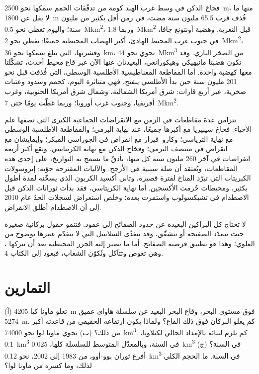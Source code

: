 فخاخ الدكن في وسط غرب الهند كومة من تدفّقات الحمم سمكها نحو \qty{2500}{m}، منها ما لا يقل عن \qty{1800}{m} قُذف قرب 65.5 مليون سنة مضت، في زمن أقل بكثير من مليون سنة؛ واليوم تغطي نحو \qty{0.5}{\mega km^2}، وربما \qty{1.8}{\mega km^2} قبل التعرية. وهضبة أونتونغ جافا، في جنوب غرب المحيط الهادئ، أكبر الهضاب المحيطية جميعًا: تغطي نحو \qty{2}{\mega km^2}، وقشرتها، التي يبلغ سمكها نحو \qty{36}{km}، تحوي نحو \qty{44}{\mega km^3} من الصخر الناري. وقد تكون هضبتا مانيهيكي وهيكورانغي، البعيدتان عنها الآن عبر قاع محيط أحدث، تشكّلتا معها كهضبة واحدة. أما المقاطعة المغناطيسية الأطلسية الوسطى، التي قُذفت قبل نحو 201 مليون سنة حين بدأ الأطلسي ينفتح، فهي متناثرة اليوم، كحمم وسدود وعتبات صخرية، عبر أربع قارات: شرق أمريكا الشمالية، وشمال شرق أمريكا الجنوبية، وغرب أفريقيا، وجنوب غرب أوروبا؛ وربما غطّت يومًا حتى \qty{7}{\mega km^2}.


تتزامن عدة مقاطعات في الزمن مع الانقراضات الجماعية الكبرى التي تصفها علم الأحياء: فخاخ سيبيريا مع أكبرها جميعًا، عند نهاية البرمي؛ والمقاطعة الأطلسية الوسطى مع نهاية الترياسي؛ وكارو–فيرار مع انقراض في الجوراسي المبكر؛ وإيمايشان مع انقراض في منتصف البرمي؛ وفخاخ الدكن مع نهاية الكريتاسي. وتقع أكبر أربعة انقراضات في آخر 260 مليون سنة كل منها، بأدقّ ما تسمح به التواريخ، على إحدى هذه المقاطعات، ويُعتقد أن صلة سببية هي الأرجح. والآليات المقترحة جوّية: إيروسولات الكبريتات التي تبرّد المناخ لفترة قصيرة، وثاني أكسيد الكربون الذي يسخّنه لمدة أطول بكثير، ومحيطات حُرمت الأكسجين. أما نهاية الكريتاسي، فقد بدأت ثورانات الدكن قبل الاصطدام في تشيكسولوب واستمرت بعده؛ وخلص استعراض لسجلات الحدّ عام 2010 إلى أن الاصطدام أطلق الانقراض.

لا تحتاج كل البراكين البعيدة عن حدود الصفائح إلى عمود. فتنمو حقول بركانية صغيرة حيث تتمدّد الصفيحة أو تتشقّق، وقد تتغذّى السلاسل التي لا يتقدّم عمرها بوضوح من  العلوي؛ وهذا هو تطبيق فرضية الصفائح. أما ما تصير إليه الجزر المحيطية بعد أن تتركها ، وهي تغوص وتتآكل وتُكوّن الشعاب، فيعود إلى الكتاب 4.

\section{التمارين}

\begin{exercise}[$\star$]\label{exo:b1:hotspots:1}
(أ) تعلو ماونا كيا \qty{4205}{m} فوق مستوى البحر، وقاع البحر البعيد عن سلسلة هاواي عميق \qty{5274}{m}. كم يعلو البركان فوق ذلك القاع؟ ولماذا يكون ارتفاعه الحقيقي من قاعدته أكبر من ذلك؟ (ب) تحوي ماونا لوا نحو \qty{74000}{km^3}. كم يلزم لبنائه بالإمداد الحالي لكيلاويا، \qty{0.1}{km^3} في السنة، وبالمعدّل المتوسط للسلسلة كلها، \qty{0.025}{km^3} في السنة؟ (ج) أفرغ ثوران بوو-أوو، من 1983 إلى 2002، نحو \qty{0.12}{km^3} في السنة. ما الحجم الكلي لذلك، وما كسره من ماونا لوا؟
\end{exercise}

